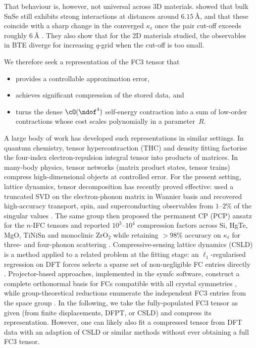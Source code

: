That behaviour is, however, not universal across 3D materials. \citeauthor{qin_accelerating_2018}
showed that bulk SnSe still exhibits strong interactions at distances around $6.15~\text{\AA}$,
and that these coincide with a sharp change in the converged $\kappa_\ell$ once the pair cut-off
exceeds roughly $6~\text{\AA}$ \cite{qin_accelerating_2018}. They also show that for the 2D
materials studied, the observables in BTE diverge for increasing $q$-grid when the cut-off is too
small.

We therefore seek a representation of the FC3 tensor that
\begin{itemize}
    \item provides a controllable approximation error,
    \item achieves significant compression of the stored data, and
    \item turns the dense $\cO(\ndof^{4})$ self-energy contraction into a sum of low-order
          contractions whose cost scales polynomially in a parameter~$R$.
\end{itemize}
A large body of work has developed such representations in similar settings.
In quantum chemistry, tensor hypercontraction (THC) \cite{hohenstein_tensor_2012,
parrish_tensor_2012} and density fitting \cite{whitten_coulombic_1973} factorise the four-index
electron-repulsion integral tensor into products of matrices. In many-body physics, tensor
networks (matrix product states, tensor trains) \cite{oseledets_tensor-train_2011,
cichocki_tensor_2016} compress high-dimensional objects at controlled error. For the present
setting, lattice dynamics, tensor decomposition has recently proved effective:
\citeauthor{luo_data-driven_2024} used a truncated SVD on the electron-phonon matrix in Wannier
basis and recovered high-accuracy transport, spin, and superconducting observables from $1$--$2\%$
of the singular values \cite{luo_data-driven_2024}. The same group then proposed the permanent
CP (PCP) ansatz for the $n$-IFC tensors and reported $10^{3}$--$10^{4}$ compression factors
across Si, HgTe, MgO, TiNiSn and monoclinic ZrO$_2$ while retaining $>98\%$ accuracy on
$\kappa_\ell$ for three- and four-phonon scattering \cite{luo_tensor_2025}. Compressive-sensing
lattice dynamics (CSLD) is a method applied to a related problem at the fitting stage: an
$\ell_1$-regularised regression on DFT forces selects a sparse set of non-negligible FC entries
directly \cite{zhou_lattice_2014, zhou_compressive_2019}. Projector-based approaches, implemented
in the symfc software, construct a complete orthonormal basis for FCs compatible with all
crystal symmetries \cite{seko_projector-based_2024}, while group-theoretical reductions enumerate
the independent FC3 entries from the space group \cite{fu_group_2019}. In the following, we take
the fully-populated FC3 tensor as given (from finite displacements, DFPT, or CSLD) and compress
its representation. However, one can likely also fit a compressed tensor from DFT data with an
adaption of CSLD or similar methods without ever obtaining a full FC3 tensor.

